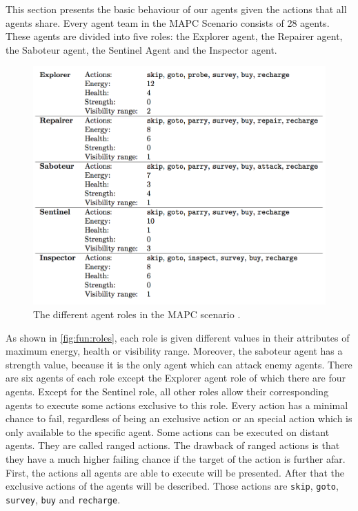 This section presents the basic behaviour of our agents given the actions that all agents share.
Every agent team in the MAPC Scenario consists of 28 agents.
These agents are divided into five roles: the Explorer agent, the Repairer agent, the Saboteur agent, the Sentinel Agent and the Inspector agent.
\begin{figure}[ht]
  \centering
  \includegraphics[width=0.9\linewidth]{images/roles.png}
  \caption{The different agent roles in the MAPC scenario \cite{ahlbrecht_mapc_2014}.}
  \label{fig:fun:roles}
\end{figure}
As shown in \autoref{fig:fun:roles}, each role is given different values in their attributes of maximum energy, health or visibility range.
Moreover, the saboteur agent has a strength value, because it is the only agent which can attack enemy agents.
There are six agents of each role except the Explorer agent role of which there are four agents.
Except for the Sentinel role, all other roles allow their corresponding agents to execute some actions exclusive to this role. 
Every action has a minimal chance to fail, regardless of being an exclusive action or an special action which is only available to the specific agent. 
Some actions can be executed on distant agents. They are called ranged actions. 
The drawback of ranged actions is that they have a much higher failing chance if the target of the action is further afar.
First, the actions all agents are able to execute will be presented. After that the exclusive actions of the agents will be described.
Those actions are \texttt{skip}, \texttt{goto}, \texttt{survey}, \texttt{buy} and \texttt{recharge}.
